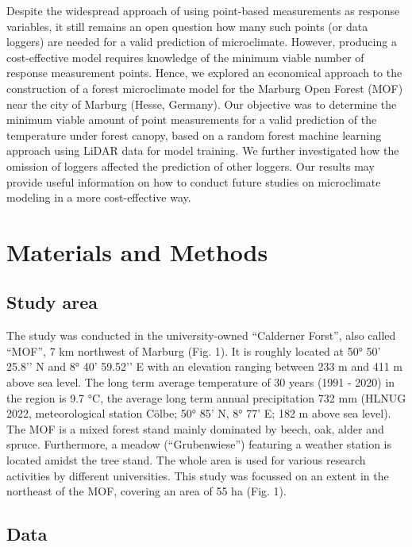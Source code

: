 \documentclass[5p]{elsarticle} %
\begin{document}
Despite the widespread approach of using point-based measurements as response variables, it still remains an open question how many such points (or data loggers) are needed for a valid prediction of microclimate. However, producing a cost-effective model requires knowledge of the minimum viable number of response measurement points. Hence, we explored an economical approach to the construction of a forest microclimate model for the Marburg Open Forest (MOF) near the city of Marburg (Hesse, Germany). Our objective was to determine the minimum viable amount of point measurements for a valid prediction of the temperature under forest canopy, based on a random forest machine learning approach using LiDAR data for model training. We further investigated how the omission of loggers affected the prediction of other loggers. Our results may provide useful information on how to conduct future studies on microclimate modeling in a more cost-effective way.



\hypertarget{materials-and-methods}{%
\section{Materials and Methods}\label{materials-and-methods}}

\hypertarget{study-area}{%
\subsection{\texorpdfstring{Study area\\
}{Study area }}\label{study-area}}

The study was conducted in the university-owned “Calderner Forst”, also called “MOF”, 7 km northwest of Marburg (Fig. 1). It is roughly located at 50° 50’ 25.8’’ N and 8° 40’ 59.52’’ E with an elevation ranging between 233 m and 411 m above sea level. The long term average temperature of 30 years (1991 - 2020) in the region is 9.7 °C, the average long term annual precipitation 732 mm (HLNUG 2022, meteorological station Cölbe; 50° 85' N, 8° 77' E; 182 m above sea level). The MOF is a mixed forest stand mainly dominated by beech, oak, alder and spruce. Furthermore, a meadow (“Grubenwiese”) featuring a weather station is located amidst the tree stand. The whole area is used for various research activities by different universities. This study was focussed on an extent in the northeast of the MOF, covering an area of 55 ha (Fig. 1).


\hypertarget{data}{%
\subsection{\texorpdfstring{Data\\
}{Data }}\label{data}}
\end{document}
